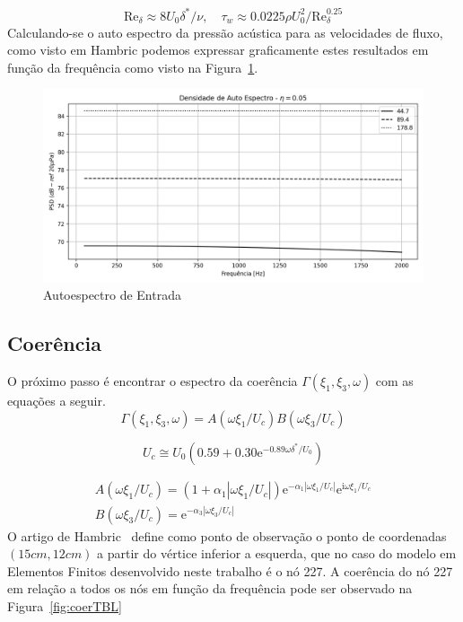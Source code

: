 \documentclass[9pt,a4paper,twoside]{rho-class/rho}
\begin{document}
\begin{equation}
	\mathrm{Re}_\delta\approx8U_0\delta^*/\nu, \quad \tau_w\approx0.0225\rho U_0^2/\mathrm{Re}_\delta^{0.25}
\end{equation}
Calculando-se o auto espectro da pressão acústica para as velocidades de fluxo, como visto em Hambric \cite{hambricVibrationsPlatesClamped2004} podemos expressar graficamente estes resultados em função da frequência como visto na Figura~\ref{fig:psd}.
\begin{figure}[H]
	\centering
	\includegraphics[width=0.9\columnwidth]{figures/psd_vel.png}
	\caption{Autoespectro de Entrada}
	\label{fig:psd}
\end{figure}

\subsection{Coerência}

O próximo passo é encontrar o espectro da coerência $\Gamma(\xi_1,\xi_3,\omega)$ com as equações a seguir. 
\begin{equation}
	\Gamma(\xi_1,\xi_3,\omega)=A(\omega\xi_1/U_c)B(\omega\xi_3/U_c)
\end{equation}

\begin{equation}
	U_c\cong U_0(0.59+0.30\mathrm{e}^{-0.89\omega\delta^*/U_0})
\end{equation}

\begin{eqnarray}
	A(\omega\xi_1/U_c)=(1+\alpha_1|\omega\xi_1/U_c|)\mathrm{e}^{-\alpha_1|\omega\xi_1/U_c|}\mathrm{e}^{\mathrm{i}\omega\xi_1/U_c} \\
	B(\omega\xi_3/U_c)=\mathrm{e}^{-\alpha_3|\omega\xi_3/U_c|}
\end{eqnarray}
O artigo de Hambric~\cite{hambricVibrationsPlatesClamped2004} define como ponto de observação o ponto de coordenadas $(15cm, 12cm)$ a partir do vértice inferior a esquerda, que no caso do modelo em Elementos Finitos desenvolvido neste trabalho é o nó 227. A coerência do nó 227 em relação a todos os nós em função da frequência pode ser observado na Figura~\ref{fig:coerTBL}
\end{document}
